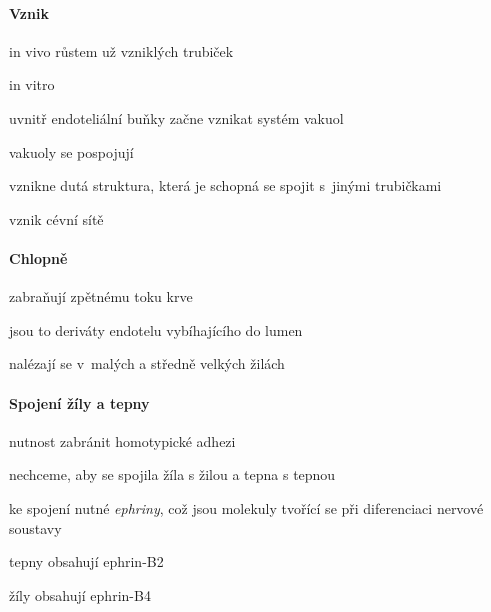 \documentclass[DIV=8]{scrreprt}
\begin{document}
\paragraph{Vznik}
\begin{myItemize}[nosep]
    \item in vivo růstem už vzniklých trubiček
    \item in vitro
\begin{myEnumerate}[nosep]
    \item uvnitř endoteliální buňky začne vznikat systém vakuol
    \item vakuoly se pospojují
    \item vznikne dutá struktura, která je schopná se spojit s jinými trubičkami
    \item vznik cévní sítě
\end{myEnumerate}

\end{myItemize}



\paragraph{Chlopně}
\begin{myItemize}[nosep]
    \item zabraňují zpětnému toku krve
    \item jsou to deriváty endotelu vybíhajícího do lumen
    \item nalézají se v malých a středně velkých žilách
\end{myItemize}



\paragraph{Spojení žíly a tepny}
\begin{myItemize}[nosep]
    \item nutnost zabránit homotypické adhezi
\begin{myItemize}[nosep]
    \item nechceme, aby se spojila žíla s žilou a tepna s tepnou
\end{myItemize}

    \item ke spojení nutné \emph{ephriny}, což jsou molekuly tvořící se při diferenciaci nervové soustavy
\begin{myItemize}[nosep]
    \item tepny obsahují ephrin-B2
    \item žíly obsahují ephrin-B4
\end{myItemize}

\end{myItemize}
\end{document}
